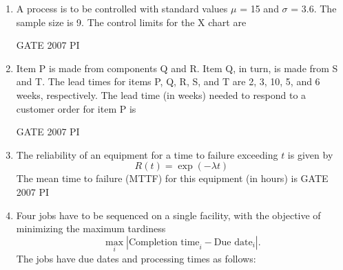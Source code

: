 \documentclass[journal,12pt,onecolumn]{IEEEtran}
\theoremstyle{remark}
\begin{document}
\begin{enumerate}
\item 
A process is to be controlled with standard values $\mu$
 = 15 and $\sigma$
 = 3.6. The sample size is 9. The control limits for the X chart are
 
 \hfill{GATE 2007 PI}
\begin{enumerate}
\end{enumerate}

\item 
Item P is made from components Q and R. Item Q, in turn, is made from S and T. The lead times for items P, Q, R, S, and T are 2, 3, 10, 5, and 6 weeks, respectively. The lead time (in weeks) needed to respond to a customer order for item P is

\hfill{GATE 2007 PI}
\begin{enumerate}
\end{enumerate}

\item 
The reliability of an equipment for a time to failure exceeding $t$ is given by  
\[
R(t) = \exp(-\lambda t)
\]  
The mean time to failure (MTTF) for this equipment (in hours) is
\hfill{GATE 2007 PI}
\begin{enumerate}
\end{enumerate}

\item 
Four jobs have to be sequenced on a single facility, with the objective of minimizing 
the maximum tardiness 
\[
\max_i \left| \text{Completion time}_i - \text{Due date}_i \right|.
\]
The jobs have due dates and processing times as follows:


\end{enumerate}
\end{document}
